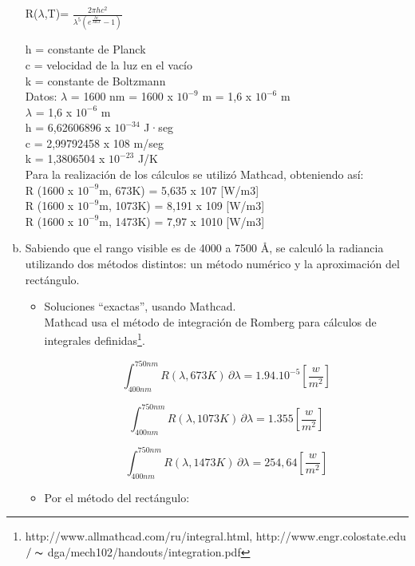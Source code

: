 \documentclass[10pt,a4paper]{article}
\begin{document}
\begin{enumerate}[a)]
\begin{center}
R($\lambda$,T)= $\frac{2 \pi h c^2}{\lambda^5(e^\frac{hc}{\lambda K T} - 1)}$
\end{center}

h = constante de Planck\\
c = velocidad de la luz en el vacío\\
k = constante de Boltzmann\\

Datos:	$\lambda$ = 1600 nm = 1600 x $10^{-9}$ m  =  1,6 x $10^{-6}$ m\\

$\lambda$ =  1,6 x $10^{-6}$ m\\
h = 6,62606896 x $10^{-34}$ J·seg\\
c = 2,99792458 x 108 m/seg\\
k = 1,3806504 x $10^{-23}$ J/K\\

Para la realización de los cálculos se utilizó Mathcad, obteniendo así:\\

R (1600 x $10^{-9}$m, 673K) = 5,635 x 107 [W/m3]\\
R (1600 x $10^{-9}$m, 1073K) = 8,191 x 109 [W/m3]\\
R (1600 x $10^{-9}$m, 1473K) = 7,97 x 1010 [W/m3]\\

\item Sabiendo que el rango visible es de 4000 a 7500 \AA , se calculó la radiancia utilizando dos métodos distintos: un método numérico y la aproximación del rectángulo.
\begin{itemize}
\item Soluciones “exactas”, usando Mathcad.\\
Mathcad usa el método de integración de Romberg para cálculos de integrales definidas\footnote{http://www.allmathcad.com/ru/integral.html,
http://www.engr.colostate.edu$/\thicksim$ dga/mech102/handouts/integration.pdf}.

\[
\int_{400 nm}^{750 nm} \! R( \lambda, 673K)  \,\partial \lambda = 1.94 .10^{-5} \left[\frac{w}{m^2} \right]
\]

\[
\int_{400 nm}^{750 nm} \! R( \lambda, 1073K)  \,\partial \lambda = 1.355 \left[\frac{w}{m^2} \right]
\]

\[
\int_{400 nm}^{750 nm} \! R( \lambda, 1473K)  \,\partial \lambda = 254,64 \left[\frac{w}{m^2} \right]
\]
\item Por el método del rectángulo:\\


\end{itemize}
\end{enumerate}
\end{document}
